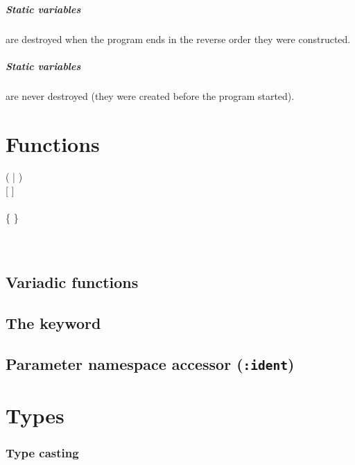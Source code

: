 \paragraph{Static variables} are destroyed when the program ends in the reverse order they were constructed.

\paragraph{Static  variables} are never destroyed (they were created before the program started).

\chapter{Functions}
\begin{grammar}
	    (  | \kwd{;} ) \\
	 [  \kwd{(}  \kwd{)} ]  \\
	\\
	 \kwd{\{} \{  \} \kwd{\}} \\
	  \\
		\grAltLn {} \kwd{;} \\
\end{grammar}

\section{Variadic functions}

\section{The  keyword}

\section{Parameter namespace accessor (\texttt{:ident})}

\chapter{Types}

\subsection{Type casting}

